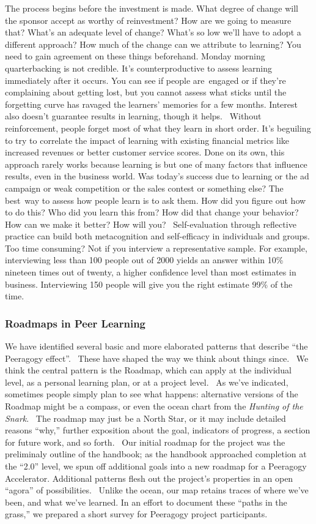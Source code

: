 The process begins before the investment is made. What degree of change
will the sponsor accept as worthy of reinvestment? How are we going to
measure that? What's an adequate level of change? What's so low we'll
have to adopt a different approach? How much of the change can we
attribute to learning? You need to gain agreement on these things
beforehand. Monday morning quarterbacking is not credible. It's
counterproductive to assess learning immediately after it occurs. You
can see if people are~engaged or if they're complaining about getting
lost, but you cannot assess what sticks until the forgetting curve has
ravaged the learners' memories for a few months. Interest also doesn't
guarantee results in learning, though it helps.~ Without reinforcement,
people forget most of what they learn in short order. It's beguiling to
try to correlate the impact of learning with existing financial metrics
like increased revenues or better customer service scores. Done on its
own, this approach rarely works because learning is but one of many
factors that influence results, even in the business world. Was today's
success due to learning or the ad campaign or weak competition or the
sales contest or something else? The best~way to assess how people learn
is to ask them. How did you figure out how to do this? Who did you learn
this from? How did that change your behavior? How can we make it better?
How will you?~ Self-evaluation through reflective practice can build
both metacognition and self-efficacy in individuals and groups. Too time
consuming? Not if you interview a representative sample. For example,
interviewing less than 100 people out of 2000 yields an answer within
10\% nineteen times out of twenty, a higher confidence level than most
estimates in business. Interviewing 150 people will give you the right
estimate 99\% of the time.

\subsubsection{Roadmaps in Peer Learning}

We have identified several basic and more elaborated patterns that
describe ``the Peeragogy effect''.~ These have shaped the way we think
about things since.~ We think the central pattern is the Roadmap,
which can apply at the individual level, as a personal learning plan,
or at a project level.~ As we've indicated, sometimes people simply
plan to see what happens: alternative versions of the Roadmap might be
a compass, or even the ocean chart from the \emph{Hunting of the
  Snark}.~ The roadmap may just be a North Star, or it may include
detailed reasons ``why,'' further exposition about the goal,
indicators of progress, a section for future work, and so forth.~ Our
initial roadmap for the project was the preliminaly outline of the
handbook; as the handbook approached completion at the ``2.0'' level,
we spun off additional goals into a new roadmap for a Peeragogy
Accelerator. Additional patterns flesh out the project's properties in
an open ``agora'' of possibilities.~ Unlike the ocean, our map retains
traces of where we've been, and what we've learned. In an effort to
document these ``paths in the grass,'' we prepared a short survey for
Peeragogy project participants.

